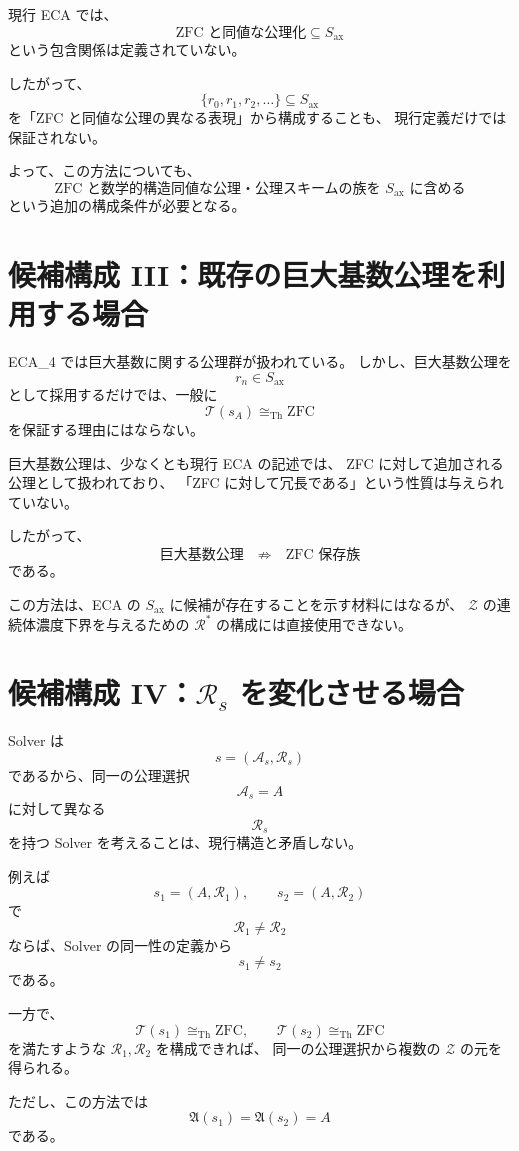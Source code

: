 \documentclass[a4paper,11pt]{article}
\newcommand{\Ax}{S_{\mathrm{ax}}}
\begin{document}
現行 ECA では、
\[
\text{ZFC と同値な公理化}
\subseteq
\Ax
\]
という包含関係は定義されていない。

したがって、
\[
\{r_0,r_1,r_2,\ldots\}\subseteq\Ax
\]
を「ZFC と同値な公理の異なる表現」から構成することも、
現行定義だけでは保証されない。

よって、この方法についても、
\[
\boxed{
\text{ZFC と数学的構造同値な公理・公理スキームの族を $\Ax$ に含める}
}
\]
という追加の構成条件が必要となる。

\section{候補構成 III：既存の巨大基数公理を利用する場合}

ECA_4 では巨大基数に関する公理群が扱われている。
しかし、巨大基数公理を
\[
r_n\in\Ax
\]
として採用するだけでは、一般に
\[
\mathcal{T}(s_A)\cong_{\mathrm{Th}}\mathrm{ZFC}
\]
を保証する理由にはならない。

巨大基数公理は、少なくとも現行 ECA の記述では、
ZFC に対して追加される公理として扱われており、
「ZFC に対して冗長である」という性質は与えられていない。

したがって、
\[
\text{巨大基数公理}
\quad\not\Rightarrow\quad
\text{ZFC 保存族}
\]
である。

この方法は、ECA の $\Ax$ に候補が存在することを示す材料にはなるが、
$\mathcal{Z}$ の連続体濃度下界を与えるための
$\mathcal{R}^{*}$ の構成には直接使用できない。

\section{候補構成 IV：$\mathcal{R}_s$ を変化させる場合}

Solver は
\[
s=(\mathcal{A}_s,\mathcal{R}_s)
\]
であるから、同一の公理選択
\[
\mathcal{A}_s=A
\]
に対して異なる
\[
\mathcal{R}_s
\]
を持つ Solver を考えることは、現行構造と矛盾しない。

例えば
\[
s_1=(A,\mathcal{R}_1),
\qquad
s_2=(A,\mathcal{R}_2)
\]
で
\[
\mathcal{R}_1\neq\mathcal{R}_2
\]
ならば、Solver の同一性の定義から
\[
s_1\neq s_2
\]
である。

一方で、
\[
\mathcal{T}(s_1)\cong_{\mathrm{Th}}\mathrm{ZFC},
\qquad
\mathcal{T}(s_2)\cong_{\mathrm{Th}}\mathrm{ZFC}
\]
を満たすような $\mathcal{R}_1,\mathcal{R}_2$ を構成できれば、
同一の公理選択から複数の $\mathcal{Z}$ の元を得られる。

ただし、この方法では
\[
\mathfrak{A}(s_1)=\mathfrak{A}(s_2)=A
\]
である。
\end{document}

